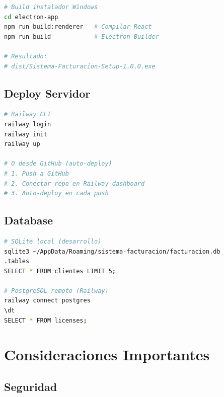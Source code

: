 \documentclass[11pt,a4paper]{article}
\begin{document}
\begin{lstlisting}[language=bash]
# Build instalador Windows
cd electron-app
npm run build:renderer   # Compilar React
npm run build            # Electron Builder

# Resultado:
# dist/Sistema-Facturacion-Setup-1.0.0.exe
\end{lstlisting}

\subsection{Deploy Servidor}

\begin{lstlisting}[language=bash]
# Railway CLI
railway login
railway init
railway up

# O desde GitHub (auto-deploy)
# 1. Push a GitHub
# 2. Conectar repo en Railway dashboard
# 3. Auto-deploy en cada push
\end{lstlisting}

\subsection{Database}

\begin{lstlisting}[language=bash]
# SQLite local (desarrollo)
sqlite3 ~/AppData/Roaming/sistema-facturacion/facturacion.db
.tables
SELECT * FROM clientes LIMIT 5;

# PostgreSQL remoto (Railway)
railway connect postgres
\dt
SELECT * FROM licenses;
\end{lstlisting}

\newpage

\section{Consideraciones Importantes}

\subsection{Seguridad}
\end{document}
